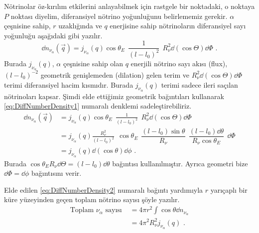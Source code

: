 Nötrinolar öz-kırılım etkilerini anlayabilmek için rastgele bir noktadaki, o noktaya $ P $ noktası diyelim, diferansiyel nötrino yoğunluğunu belirlememiz gerekir. $ \alpha $ çeşnisine sahip, $ r $ uzaklığında ve $ q $ enerjisine sahip nötrinoların diferansiyel sayı yoğunluğu aşağıdaki gibi yazılır.
\begin{equation} \label{eq:DiffNumberDensity1}
    \dd{n_{\nu_{\alpha}}}(\vec{q}) = j_{\nu_{\alpha}}(q) \cos \theta_{E}  ~~ \frac{1}{(l-l_{0})^{2}} ~~ R^{2}_{\nu} \dd(\cos \Theta) \dd \Phi \text{ .}
\end{equation}
Burada $j_{\nu_{\alpha}}(q)$, $ \alpha $ çeşnisine sahip olan $ q $ enerjili nötrino sayı akısı (flux), $ (l-l_{0})^{-2} $ geometrik genişlemeden (dilation) gelen terim ve $ R^{2}_{\nu} \dd(\cos \Theta) \dd \Phi $ terimi diferansiyel hacim kısmıdır. Burada  $j_{\nu_{\alpha}}(q)$ terimi sadece ileri saçılan nötrinoları kapsar. Şimdi elde ettiğimiz geometrik bağıntıları kullanarak \eqref{eq:DiffNumberDensity1} numaralı denklemi sadeleştirebiliriz.
\begin{align}\label{eq:DiffNumberDensity2}
    \nonumber\dd{n_{\nu_{\alpha}}}(\vec{q}) &= j_{\nu_{\alpha}}(q) \cos \theta_{E}  ~~ \frac{1}{(l-l_{0})^{2}} ~~ R^{2}_{\nu} \dd(\cos \Theta) \dd \Phi\\
	\nonumber &= j_{\nu_{\alpha}}(q) \frac{R^{2}_{\nu}}{(l-l_{0})^{2}} ~~  \cos \theta_{E} ~~ \dfrac{(l-l_{0}) \sin \theta}{R_{\nu}} ~~\dfrac{(l-l_{0}) \dd \theta}{R_{\nu} \cos \theta_{E}} ~~\dd \Phi\\
	 &= j_{\nu_{\alpha}}(q) \dd (\cos \theta) \dd \phi  \text{ .}
\end{align}
Burada $ \cos \theta_{E} R_{\nu} \dd \Theta = (l-l_{0}) \dd \theta $ bağıntısı kullanılmıştır. Ayrıca geometri bize $ \dd \Phi = \dd \phi $ bağıntısını verir.

Elde edilen \eqref{eq:DiffNumberDensity2} numaralı bağıntı yardımıyla $ r $ yarıçaplı bir küre yüzeyinden geçen toplam nötrino sayısı şöyle yazılır.
\begin{align}
    \nonumber \text{Toplam } \nu_{\alpha} \text{ sayısı }&= 4\pi r^{2} \int \cos \theta \dd n_{\nu_{\alpha}} \\
    &= 4\pi^{2}R_{\nu}^{2}j_{\nu_{\alpha}}(q) \text{ .}
\end{align}

